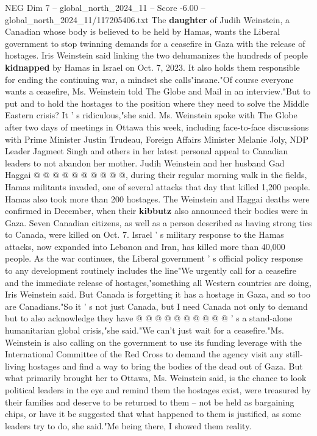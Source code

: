 \begin{textsample}{NEG Dim 7 – global\_north\_2024\_11 – Score -6.00 – global\_north\_2024\_11/117205406.txt}  \label{ex:f7_neg_256}
The \textbf{daughter} of Judih Weinstein, a Canadian whose body is believed to be held by Hamas, wants the Liberal government to stop twinning demands for a ceasefire in Gaza with the release of hostages.
Iris Weinstein said linking the two dehumanizes the hundreds of people \textbf{kidnapped} by Hamas in Israel on Oct. 7, 2023.
It also holds them responsible for ending the continuing war, a mindset she calls"insane."Of course everyone wants a ceasefire, Ms.
Weinstein told The Globe and Mail in an interview."But to put and to hold the hostages to the position where they need to solve the Middle Eastern crisis?
It ' s ridiculous,"she said.
Ms.
Weinstein spoke with The Globe after two days of meetings in Ottawa this week, including face-to-face discussions with Prime Minister Justin Trudeau, Foreign Affairs Minister Melanie Joly, NDP Leader Jagmeet Singh and others in her latest personal appeal to Canadian leaders to not abandon her mother.
Judih Weinstein and her husband Gad Haggai @ @ @ @ @ @ @ @ @ @, during their regular morning walk in the fields, Hamas militants invaded, one of several attacks that day that killed 1,200 people.
Hamas also took more than 200 hostages.
The Weinstein and Haggai deaths were confirmed in December, when their \textbf{kibbutz} also announced their bodies were in Gaza.
Seven Canadian citizens, as well as a person described as having strong ties to Canada, were killed on Oct. 7.
Israel ' s military response to the Hamas attacks, now expanded into Lebanon and Iran, has killed more than 40,000 people.
As the war continues, the Liberal government ' s official policy response to any development routinely includes the line"We urgently call for a ceasefire and the immediate release of hostages,"something all Western countries are doing, Iris Weinstein said.
But Canada is forgetting it has a hostage in Gaza, and so too are Canadians."So it ' s not just Canada, but I need Canada not only to demand but to also acknowledge they have @ @ @ @ @ @ @ @ @ @ ' s a stand-alone humanitarian global crisis,"she said."We can't just wait for a ceasefire."Ms.
Weinstein is also calling on the government to use its funding leverage with the International Committee of the Red Cross to demand the agency visit any still-living hostages and find a way to bring the bodies of the dead out of Gaza.
But what primarily brought her to Ottawa, Ms.
Weinstein said, is the chance to look political leaders in the eye and remind them the hostages exist, were treasured by their families and deserve to be returned to them -- not be held as bargaining chips, or have it be suggested that what happened to them is justified, as some leaders try to do, she said."Me being there, I showed them reality.

\end{textsample}
